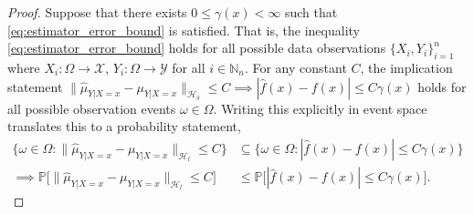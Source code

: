 \documentclass[runningheads, envcountsame, a4paper]{llncs}
\begin{document}
		\begin{proof}
			Suppose that there exists $0 \leq \gamma(x) < \infty$ such that \eqref{eq:estimator_error_bound} is satisfied. That is, the inequality \eqref{eq:estimator_error_bound} holds for all possible data observations $\{X_{i}, Y_{i}\}_{i = 1}^{n}$ where $X_{i} : \Omega \to \mathcal{X}$,  $Y_{i} : \Omega \to \mathcal{Y}$ for all $i \in \mathbb{N}_{n}$. For any constant $C$, the implication statement $\big\| \hat{\mu}_{Y | X = x} - \mu_{Y | X = x} \big\|_{\mathcal{H}_{\delta}} \leq C \implies | \hat{f}(x) - f(x) | \leq C \gamma(x)$ holds for all possible observation events $\omega \in \Omega$. Writing this explicitly in event space translates this to a probability statement,
			\begin{equation}
			\begin{aligned}
				\{\omega \in \Omega : \big\| \hat{\mu}_{Y | X = x} - \mu_{Y | X = x} \big\|_{\mathcal{H}_{l}} \leq C\} &\subseteq \{\omega \in \Omega : | \hat{f}(x) - f(x) | \leq C \gamma(x)\} \\
				\implies \mathbb{P}\Big[\big\| \hat{\mu}_{Y | X = x} - \mu_{Y | X = x} \big\|_{\mathcal{H}_{l}} \leq C\Big] &\leq \mathbb{P}\Big[| \hat{f}(x) - f(x) | \leq C \gamma(x) \Big].
			\label{eq:probability_statement}
			\end{aligned}
			\end{equation}
			

\end{proof}
\end{document}
